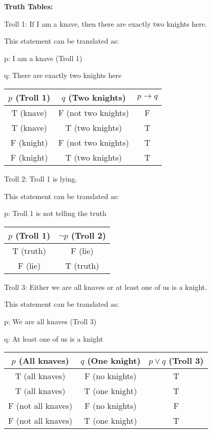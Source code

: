 \documentclass{article}
\begin{document}
  \textbf{Truth Tables:}

  Troll 1: If I am a knave, then there are exactly two knights here.

  This statement can be translated as:

  p: I am a knave (Troll 1)

  q: There are exactly two knights here

  {
  \setlength{\tabcolsep}{10pt} %
  \renewcommand{\arraystretch}{1.5} %
  \begin{tabular}{|c|c|c|}
    \hline
    $p$ (Troll 1) & $q$ (Two knights) & $p \rightarrow q$ \\
    \hline
    T (knave) & F (not two knights) & F \\
    T (knave) & T (two knights) & T \\
    F (knight) & F (not two knights) & T \\
    F (knight) & T (two knights) & T \\
    \hline
  \end{tabular}
  }

  Troll 2: Troll 1 is lying.

  This statement can be translated as:

  p: Troll 1 is not telling the truth

  {
  \setlength{\tabcolsep}{10pt} %
  \renewcommand{\arraystretch}{1.5} %
  \begin{tabular}{|c|c|}
    \hline
    $p$ (Troll 1) & $\neg p$ (Troll 2) \\
    \hline
    T (truth) & F (lie) \\
    F (lie) & T (truth) \\
    \hline
  \end{tabular}
  }

  Troll 3: Either we are all knaves or at least one of us is a knight.

  This statement can be translated as:

  p: We are all knaves (Troll 3)

  q: At least one of us is a knight

  {
  \setlength{\tabcolsep}{10pt} %
  \renewcommand{\arraystretch}{1.5} %
  \begin{tabular}{|c|c|c|}
    \hline
    $p$ (All knaves) & $q$ (One knight) & $p \vee q$ (Troll 3) \\
    \hline
    T (all knaves) & F (no knights) & T \\
    T (all knaves) & T (one knight) & T \\
    F (not all knaves) & F (no knights) & F \\
    F (not all knaves) & T (one knight) & T \\
    \hline
  \end{tabular}
  }
\end{document}
